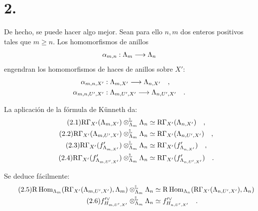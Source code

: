 \section*{2.}
De hecho, se puede hacer algo mejor. Sean para ello $n,m$ dos enteros positivos tales que $m \geq n$. Los homomorfismos de anillos
\[
\alpha_{m,n} : \Lambda_m \longrightarrow \Lambda_n
\]
engendran los homomorfismos de haces de anillos sobre $X'$:
\begin{align*}
\alpha_{m,n,X'} &: \Lambda_{m,X'} \longrightarrow \Lambda_{n,X'} \quad , \\
\alpha_{m,n,U',X'} &: \Lambda_{m,U',X'} \longrightarrow \Lambda_{n,U',X'} \quad .
\end{align*}

La aplicación de la fórmula de Künneth da:
\begin{align}
\tag{2.1} \mathrm{R}\Gamma_{X'}(\Lambda_{m,X'}) \otimes_{\Lambda_m}^{\mathbb{L}} \Lambda_n &\simeq \mathrm{R}\Gamma_{X'}(\Lambda_{n,X'}) \quad , \\
\tag{2.2} \mathrm{R}\Gamma_{X'}(\Lambda_{m,U',X'}) \otimes_{\Lambda_m}^{\mathbb{L}} \Lambda_n &\simeq \mathrm{R}\Gamma_{X'}(\Lambda_{n,U',X'}) \quad , \\
\tag{2.3} \mathrm{R}\Gamma_{X'}(f'_{\Lambda_{m,X'}}) \otimes_{\Lambda_m}^{\mathbb{L}} \Lambda_n &\simeq \mathrm{R}\Gamma_{X'}(f'_{\Lambda_{n,X'}}) \quad , \\
\tag{2.4} \mathrm{R}\Gamma_{X'}(f'_{\Lambda_{m,U',X'}}) \otimes_{\Lambda_m}^{\mathbb{L}} \Lambda_n &\simeq \mathrm{R}\Gamma_{X'}(f'_{\Lambda_{n,U',X'}}) \quad .
\end{align}

Se deduce fácilmente:
\begin{align}
\tag{2.5} \mathrm{R}\operatorname{Hom}_{\Lambda_m}(\mathrm{R}\Gamma_{X'}(\Lambda_{m,U',X'}), \Lambda_m) \otimes_{\Lambda_m}^{\mathbb{L}} \Lambda_n &\simeq \mathrm{R}\operatorname{Hom}_{\Lambda_n}(\mathrm{R}\Gamma_{X'}(\Lambda_{n,U',X'}), \Lambda_n) \\
\tag{2.6} f'^\vee_{H_{m,U',X'}} \otimes_{\Lambda_m}^{\mathbb{L}} \Lambda_n &\simeq f'^\vee_{H_{n,U',X'}} \quad .
\end{align}
